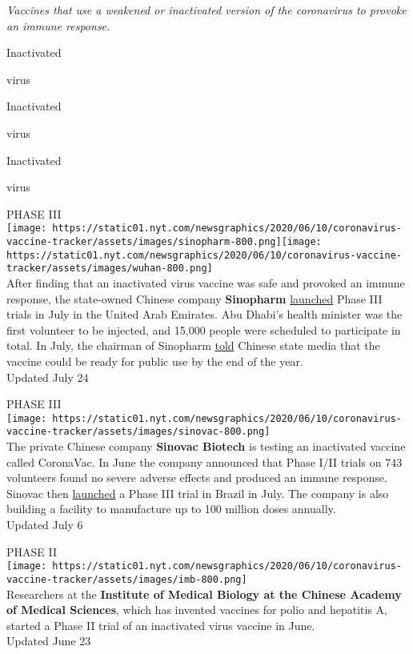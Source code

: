 \emph{Vaccines that use a weakened or inactivated version of the
coronavirus to provoke an immune response.}

Inactivated

virus

Inactivated

virus

Inactivated

virus

PHASE III\\
\texttt{[image: https://static01.nyt.com/newsgraphics/2020/06/10/coronavirus-vaccine-tracker/assets/images/sinopharm-800.png]}\texttt{[image: https://static01.nyt.com/newsgraphics/2020/06/10/coronavirus-vaccine-tracker/assets/images/wuhan-800.png]}\\
After finding that an inactivated virus vaccine was safe and provoked an
immune response, the state-owned Chinese company \textbf{Sinopharm}
\href{https://www.thenational.ae/world/coronavirus-live-uk-accuses-russia-of-trying-to-steal-vaccine-research-1.1042256}{launched}
Phase III trials in July in the United Arab Emirates. Abu Dhabi's health
minister was the first volunteer to be injected, and 15,000 people were
scheduled to participate in total. In July, the chairman of Sinopharm
\href{https://www.reuters.com/article/us-health-coronavirus-vaccine-china/chinas-sinopharm-says-coronavirus-vaccine-could-be-ready-by-year-end-state-media-idUSKCN24O0PM}{told}
Chinese state media that the vaccine could be ready for public use by
the end of the year.\\
Updated July 24

PHASE III\\
\texttt{[image: https://static01.nyt.com/newsgraphics/2020/06/10/coronavirus-vaccine-tracker/assets/images/sinovac-800.png]}\\
The private Chinese company \textbf{Sinovac Biotech} is testing an
inactivated vaccine called CoronaVac. In June the company announced that
Phase I/II trials on 743 volunteers found no severe adverse effects and
produced an immune response. Sinovac then
\href{http://www.sinovac.com/?optionid=754\&auto_id=907}{launched} a
Phase III trial in Brazil in July. The company is also building a
facility to manufacture up to 100 million doses annually.\\
Updated July 6

PHASE II\\
\texttt{[image: https://static01.nyt.com/newsgraphics/2020/06/10/coronavirus-vaccine-tracker/assets/images/imb-800.png]}\\
Researchers at the \textbf{Institute of Medical Biology at the Chinese
Academy of Medical Sciences}, which has invented vaccines for polio and
hepatitis A, started a Phase II trial of an inactivated virus vaccine in
June.\\
Updated June 23

